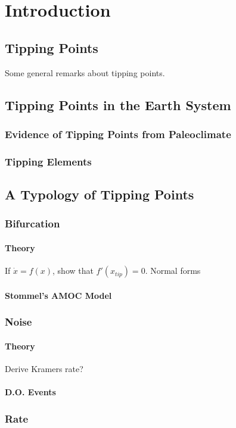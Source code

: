 \chapter{Introduction}
\graphicspath{{introduction/figs}}

\section{Tipping Points}
Some general remarks about tipping points.

\section{Tipping Points in the Earth System}
\subsection{Evidence of Tipping Points from Paleoclimate}
\subsection{Tipping Elements}

\section{A Typology of Tipping Points}
\subsection{Bifurcation}
\subsubsection{Theory}
If $\dot{x} = f(x)$, show that $f'(x_{tip}) = 0$. Normal forms
\subsubsection{Stommel's AMOC Model}
\subsection{Noise}
\subsubsection{Theory}
Derive Kramers rate?
\subsubsection{D.O. Events}
\subsection{Rate}
